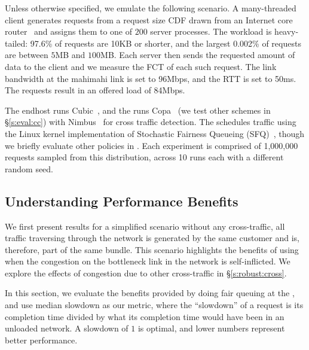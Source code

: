 Unless otherwise specified, we emulate the following scenario.
A many-threaded client generates requests from a request size CDF drawn from an Internet core router~\cite{caida-dataset} and assigns them to one of $200$ server processes.
The workload is heavy-tailed: 97.6\% of requests are 10KB or shorter, and the largest 0.002\% of requests are between $5$MB and $100$MB.
Each server then sends the requested amount of data to the client and we measure the FCT of each such request. 
The link bandwidth at the mahimahi link is set to 96Mbps, and the RTT is set to 50ms. The requests result in an offered load of 84Mbps. 

The endhost runs Cubic~\cite{cubic}, and the \inbox runs Copa~\cite{copa} (we test other schemes in \S\ref{s:eval:cc}) with Nimbus~\cite{nimbus-arxiv} for cross traffic detection.
The \inbox schedules traffic using the Linux kernel implementation of Stochastic Fairness Queueing (SFQ)~\cite{sfq}, though we briefly evaluate other policies in .
Each experiment is comprised of 1,000,000 requests sampled from this distribution, across 10 runs each with a different random seed.


\subsection{Understanding Performance Benefits}\label{s:eval:fct}

We first present results for a simplified scenario without any cross-traffic, \ie all traffic traversing through the network is generated by the same customer and is, therefore, part of the same bundle. 
This scenario highlights the benefits of using \name when the congestion on the bottleneck link in the network is self-inflicted. We explore the effects of congestion due to other cross-traffic in \S\ref{s:robust:cross}.


\newcommand{\baseline}{Status Quo\xspace}
\newcommand{\optimal}{In-Network\xspace}





In this section, we evaluate the benefits provided by doing fair queuing at the \name, and use median slowdown as our metric, where the ``slowdown'' of a request is its completion time divided by what its completion time would have been in an unloaded network. A slowdown of $1$ is optimal, and lower numbers represent better performance.

